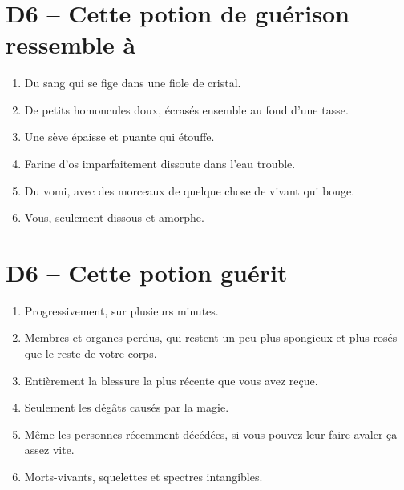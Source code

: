 \documentclass{article}
\begin{document}
\title{\vspace{-0.5cm}{\Huge One-Roll Potions de soin} \vspace{-1cm}}

\date{}

\maketitle



\section*{D6 -- Cette potion de guérison ressemble à}
\begin{enumerate}
	\item Du sang qui se fige dans une fiole de cristal.
	\item De petits homoncules doux, écrasés ensemble au fond d'une tasse.
	\item Une sève épaisse et puante qui étouffe.
	\item Farine d'os imparfaitement dissoute dans l'eau trouble.
	\item Du vomi, avec des morceaux de quelque chose de vivant qui bouge.
	\item Vous, seulement dissous et amorphe.
\end{enumerate}

\section*{D6 -- Cette potion guérit}
\begin{enumerate}
	\item Progressivement, sur plusieurs minutes.
	\item Membres et organes perdus, qui restent un peu plus spongieux et plus rosés que le reste de votre corps.
	\item Entièrement la blessure la plus récente que vous avez reçue.
	\item Seulement les dégâts causés par la magie.
	\item Même les personnes récemment décédées, si vous pouvez leur faire avaler ça assez vite.
	\item Morts-vivants, squelettes et spectres intangibles.
\end{enumerate}
\end{document}
